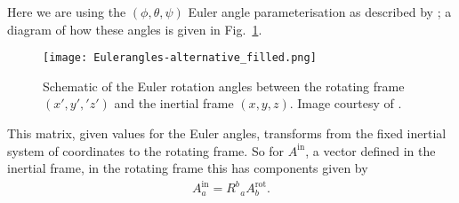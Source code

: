 \documentclass[../full_thesis/full_thesis.tex]{subfiles}
\begin{document}
Here we are using the
$(\phi, \theta, \psi)$ Euler
angle parameterisation as described by \citet{Landau1969}; a diagram of how
these angles is given in Fig.~\ref{fig: Euler}.\begin{figure}[ht]
\centering
\texttt{[image: Eulerangles-alternative\_filled.png]}
\caption{Schematic of the Euler rotation angles between the rotating
frame $(x', y', 'z')$ and the inertial frame $(x, y, z)$. Image courtesy of
 \citet{WikipediaEuler}.}
\label{fig: Euler}
\end{figure}
This matrix, given values for the Euler angles, transforms from the fixed
inertial system of coordinates to the rotating frame. So for $A^{\textrm{in}}$,
a vector defined in the inertial frame, in the rotating frame this has
components given by
\begin{align}
A^{\textrm{in}}_{a} = R^{b}_{\;\;a} A^{\textrm{rot}}_{b}.
\end{align}
\end{document}
